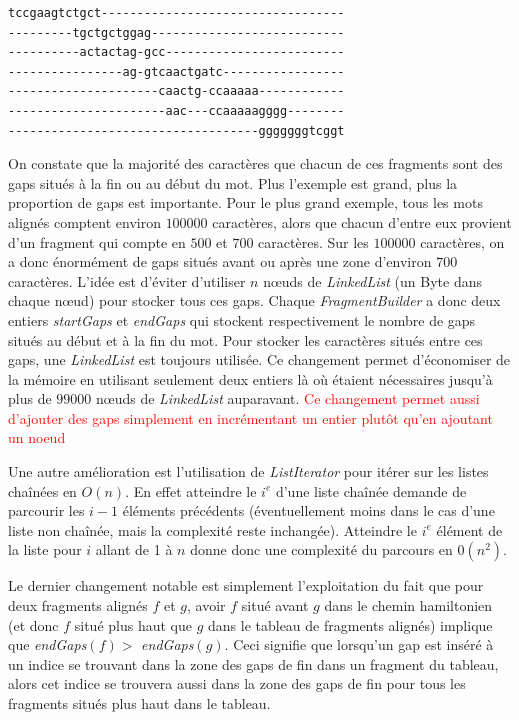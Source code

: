 \documentclass{article}
\begin{document}
\begin{verbatim}
tccgaagtctgct----------------------------------
---------tgctgctggag---------------------------
----------actactag-gcc-------------------------
----------------ag-gtcaactgatc-----------------
---------------------caactg-ccaaaaa------------
----------------------aac---ccaaaaagggg--------
-----------------------------------gggggggtcggt
\end{verbatim}

On constate que la majorité des caractères que chacun de ces fragments sont des gaps situés à la fin ou au début du mot. Plus l'exemple est grand, plus la proportion de gaps est importante. Pour le plus grand exemple, tous les mots alignés comptent environ $100000$ caractères, alors que chacun d'entre eux provient d'un fragment qui compte en $500$ et $700$ caractères. Sur les $100000$ caractères, on a donc énormément de gaps situés avant ou après une zone d'environ $700$ caractères. L'idée est d'éviter d'utiliser $n$ nœuds de \textit{LinkedList} (un Byte dans chaque nœud) pour stocker tous ces gaps.
Chaque \textit{FragmentBuilder} a donc deux entiers \textit{startGaps} et \textit{endGaps} qui stockent respectivement le nombre de gaps situés au début et à la fin du mot. Pour stocker les caractères situés entre ces gaps, une \textit{LinkedList} est toujours utilisée. Ce changement permet d'économiser de la mémoire en utilisant seulement deux entiers là où étaient nécessaires jusqu'à plus de $99000$ nœuds de \textit{LinkedList} auparavant. 
\textcolor{red}{Ce changement permet aussi d'ajouter des gaps simplement en incrémentant un entier plutôt qu'en ajoutant un noeud}

Une autre amélioration est l'utilisation de \textit{ListIterator} pour itérer sur les listes chaînées en $O(n)$. En effet atteindre le $i^e$ d'une liste chaînée demande de parcourir les $i-1$ éléments précédents (éventuellement moins dans le cas d'une liste non chaînée, mais la complexité reste inchangée). Atteindre le $i^e$ élément de la liste pour $i$ allant de 1 à $n$ donne donc une complexité du parcours en $0(n^2)$.

Le dernier changement notable est simplement l'exploitation du fait que pour deux fragments alignés $f$ et $g$, avoir $f$ situé avant $g$ dans le chemin hamiltonien (et donc $f$ situé plus haut que $g$ dans le tableau de fragments alignés) implique que \textit{endGaps}$(f) > $  \textit{endGaps}$(g)$. Ceci signifie que lorsqu'un gap est inséré à un indice se trouvant dans la zone des gaps de fin dans un fragment du tableau, alors cet indice se trouvera aussi dans la zone des gaps de fin pour tous les fragments situés plus haut dans le tableau. 
\end{document}
